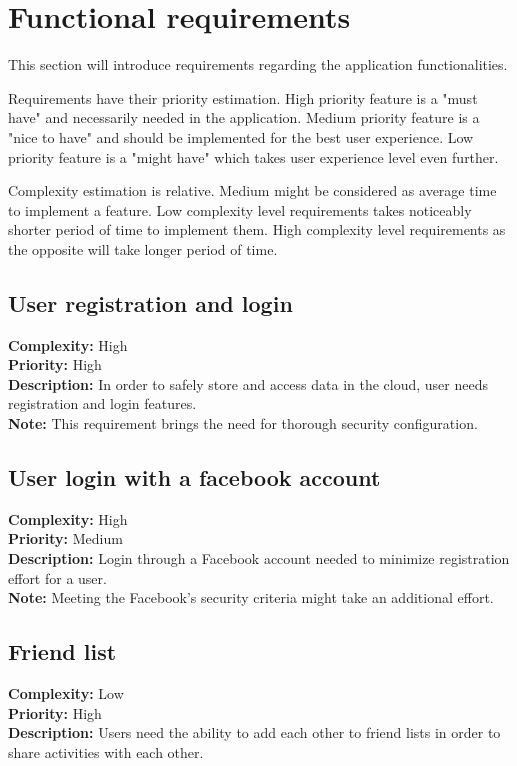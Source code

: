 
\section{Functional requirements}\label{sec:functional-requirements}

This section will introduce requirements regarding the application functionalities.

Requirements have their priority estimation.
High priority feature is a "must have" and necessarily needed in the application.
Medium priority feature is a "nice to have" and should be implemented for the best user experience.
Low priority feature is a "might have" which takes user experience level even further.

Complexity estimation is relative.
Medium might be considered as average time to implement a feature.
Low complexity level requirements takes noticeably shorter period of time to implement them.
High complexity level requirements as the opposite will take longer period of time.

\subsection{User registration and login}\label{subsec:user-registration-and-login}
\textbf{Complexity:} High\\
\textbf{Priority:} High\\
\textbf{Description:} In order to safely store and access data in the cloud, user needs registration and login features.\\
\textbf{Note:} This requirement brings the need for thorough security configuration.\\


\subsection{User login with a facebook account}\label{subsec:user-login-with-facebook-account}
\textbf{Complexity:} High\\
\textbf{Priority:} Medium\\
\textbf{Description:} Login through a Facebook account needed to minimize registration effort for a user.\\
\textbf{Note:} Meeting the Facebook's security criteria might take an additional effort.\\


\subsection{Friend list}\label{subsec:friend-list}
\textbf{Complexity:} Low\\
\textbf{Priority:} High\\
\textbf{Description:} Users need the ability to add each other to friend lists in order to share activities with each other.\\


